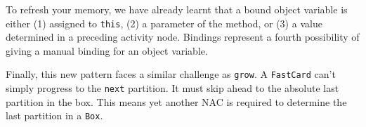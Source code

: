 To refresh your memory, we have already learnt that a bound object variable is either (1) assigned to \texttt{this}, (2) a parameter of the method, or (3) a
value determined in a preceding activity node. Bindings represent a fourth possibility of giving a manual binding for an object variable.

Finally, this new pattern faces a similar challenge as \texttt{grow}. A \texttt{FastCard} can't simply progress to the \texttt{next} partition. It must skip
ahead to the absolute last partition in the box. This means yet another NAC is required to determine the last partition in a \texttt{Box}.
  



